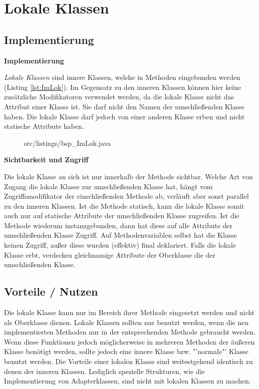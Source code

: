 \section{Lokale Klassen}
\subsection {Implementierung}

{\bf Implementierung}

{\it Lokale Klassen} sind innere Klassen, welche in Methoden eingebunden werden (Listing \ref{lst:ImLok}).
Im Gegensatz zu den inneren Klassen können hier keine zusätzliche Modifikatoren verwendet werden, da die lokale Klasse nicht das Attribut einer Klasse ist.
Sie darf nicht den Namen der umschließenden Klasse haben.
Die lokale Klasse darf jedoch von einer anderen Klasse erben und nicht statische Attribute haben.
\\
\begin{figure}[h]
\lstset{language=Java}
 {src/listings/bsp_ImLok.java}
\end{figure}
\newpage

{\bf Sichtbarkeit und Zugriff}

Die lokale Klasse an sich ist nur innerhalb der Methode sichtbar.
Welche Art von Zugang die lokale Klasse zur umschließenden Klasse hat, hängt vom Zugriffsmodifikator der einschließenden Methode ab, verläuft aber sonst parallel zu den inneren Klassen.
Ist die Methode statisch, kann die lokale Klasse somit auch nur auf statische Attribute der umschließenden Klasse zugreifen.
Ist die Methode wiederum instanzgebunden, dann hat diese auf alle Attribute der umschließenden Klasse Zugriff.
Auf Methodenvariablen selbst hat die Klasse keinen Zugriff, außer diese wurden (effektiv) final deklariert.
Falls die lokale Klasse erbt, verdecken gleichnamige Attribute der Oberklasse die der umschließenden Klasse.

\subsection{Vorteile / Nutzen}

Die lokale Klasse kann nur im Bereich ihrer Methode eingesetzt werden und nicht als Oberklasse dienen.
Lokale Klassen sollten nur benutzt werden, wenn die neu implementierten Methoden nur in der entsprechenden Methode gebraucht werden.
Wenn diese Funktionen jedoch möglicherweise in mehreren Methoden der äußeren Klasse benötigt werden, sollte jedoch eine innere Klasse bzw. "'normale"' Klasse benutzt werden.
Die Vorteile einer lokalen Klasse sind weitestgehend identisch zu denen der inneren Klassen. Lediglich spezielle Strukturen, wie die Implementierung von Adapterklassen, sind nicht mit lokalen Klassen zu machen.

